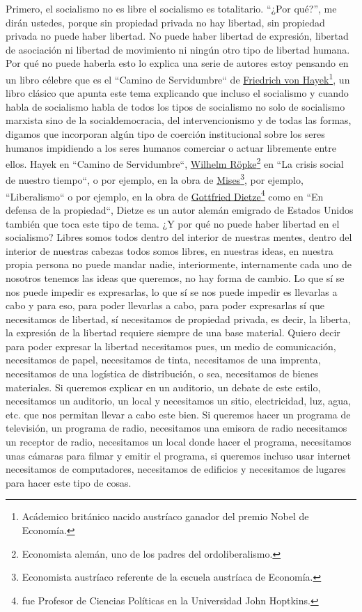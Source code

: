Primero, el socialismo no es libre el socialismo es totalitario. \enquote{¿Por qué?}, me dirán ustedes, porque sin propiedad privada no hay libertad, sin propiedad privada no puede haber libertad. No puede haber libertad de expresión, libertad de asociación ni libertad de movimiento ni ningún otro tipo de libertad humana. Por qué no puede haberla esto lo explica una serie de autores estoy pensando en un libro célebre que es el ``Camino de Servidumbre``\cite{hayek1944road} de \href{https://en.wikipedia.org/wiki/Friedrich_Hayek}{Friedrich von Hayek}\footnote{Acádemico británico nacido austríaco ganador del premio Nobel de Economía.}, un libro clásico que apunta este tema explicando que incluso el socialismo y cuando habla de socialismo habla de todos los tipos de socialismo no solo de socialismo marxista sino de la socialdemocracia, del intervencionismo y de todas las formas, digamos que incorporan algún tipo de coerción institucional sobre los seres humanos impidiendo a los seres humanos comerciar o actuar libremente entre ellos. Hayek en ``Camino de Servidumbre``, \href{https://en.wikipedia.org/wiki/Wilhelm_R%C3%B6pke}{Wilhelm Röpke}\footnote{Economista alemán, uno de los padres del ordoliberalismo.} en ``La crisis social de nuestro tiempo``\cite{röpke1950social}, o por ejemplo, en la obra de \href{https://en.wikipedia.org/wiki/Ludwig_von_Mises}{Mises}\footnote{Economista austríaco referente de la escuela austríaca de Economía.}, por ejemplo, ``Liberalismo``\cite{vonmises1995liberalism} o por ejemplo, en la obra de \href{https://mises.org/mises-daily/who-was-gottfried-dietze}{Gottfried Dietze}\footnote{fue Profesor de Ciencias Políticas en la Universidad John Hoptkins.} como en ``En defensa de la propiedad``\cite{dietze1963defense}, Dietze es un autor alemán emigrado de Estados Unidos también que toca este tipo de tema. ¿Y por qué no puede haber libertad en el socialismo? Libres somos todos dentro del interior de nuestras mentes, dentro del interior de nuestras cabezas todos somos libres, en nuestras ideas, en nuestra propia persona no puede mandar nadie, interiormente, internamente cada uno de nosotros tenemos las ideas que queremos, no hay forma de cambio. Lo que sí se nos puede impedir es expresarlas, lo que sí se nos puede impedir es llevarlas a cabo y para eso, para poder llevarlas a cabo, para poder expresarlas sí que necesitamos de libertad, sí necesitamos de propiedad privada, es decir, la liberta, la expresión de la libertad requiere siempre de una base material. Quiero decir para poder expresar la libertad necesitamos pues, un medio de comunicación, necesitamos de papel, necesitamos de tinta, necesitamos de una imprenta, necesitamos de una logística de distribución, o sea, necesitamos de bienes materiales. Si queremos explicar en un auditorio, un debate de este estilo, necesitamos un auditorio, un local y necesitamos un sitio, electricidad, luz, agua, etc. que nos permitan llevar a cabo este bien. Si queremos hacer un programa de televisión, un programa de radio, necesitamos una emisora de radio necesitamos un receptor de radio, necesitamos un local donde hacer el programa, necesitamos unas cámaras para filmar y emitir el programa, si queremos incluso usar internet necesitamos de computadores,
necesitamos de edificios y necesitamos de lugares para hacer este tipo de cosas.


